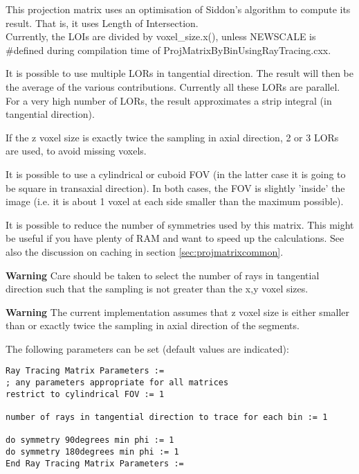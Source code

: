 \documentclass{article}
\begin{document}
{ 
}
\label{sec:projmatrixusingraytracing}
This projection matrix uses an optimisation of Siddon's algorithm 
to compute its result. That is, it uses Length of Intersection.\\
Currently, the LOIs are divided by voxel\_size.x(), unless NEWSCALE 
is \#defined during compilation time of ProjMatrixByBinUsingRayTracing.cxx. 

It is possible to use multiple LORs in tangential direction. 
The result will then be the average of the various contributions. 
Currently all these LORs are parallel. For a very high number 
of LORs, the result approximates a strip integral (in tangential 
direction).

If the z voxel size is exactly twice the sampling in axial direction, 
2 or 3 LORs are used, to avoid missing voxels. 

It is possible to use a cylindrical or cuboid FOV (in the latter 
case it is going to be square in transaxial direction). In both 
cases, the FOV is slightly 'inside' the image (i.e. it is about 
1 voxel at each side smaller than the maximum possible).

It is possible to reduce the number of symmetries used by this 
matrix. This might be useful if you have plenty of RAM and want 
to speed up the calculations. See also the discussion on caching 
in section \ref{sec:projmatrixcommon}.

\textbf{Warning} Care should be taken to select the number of rays 
in tangential direction such that the sampling is not greater 
than the x,y voxel sizes.

\textbf{Warning} The current implementation assumes that z voxel size 
is either smaller than or exactly twice the sampling in axial 
direction of the segments.

{ 
}

The following parameters can be set (default values are indicated):

\begin{verbatim}
Ray Tracing Matrix Parameters := 
; any parameters appropriate for all matrices
restrict to cylindrical FOV := 1

number of rays in tangential direction to trace for each bin := 1

do symmetry 90degrees min phi := 1 
do symmetry 180degrees min phi := 1
End Ray Tracing Matrix Parameters :=
\end{verbatim}
\end{document}
